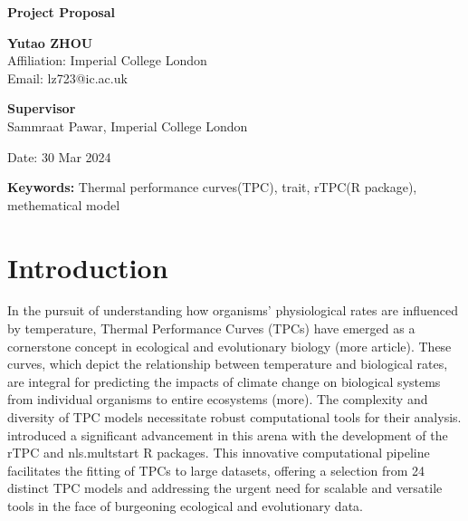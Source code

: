 \documentclass{article}
\begin{document}
\begin{titlepage}
    \begin{center}
        \vspace*{1cm}
        
        \Large
        \textbf{Project Proposal}
        
        \vspace{1.5cm}
        
        \textbf{Yutao ZHOU}\\
        Affiliation: Imperial College London\\
        Email: lz723@ic.ac.uk

        \vspace{0.8cm}

        \textbf{Supervisor}\\
        Sammraat Pawar, Imperial College London
       
        \vfill
        \Large
        Date:  30 Mar 2024
        
    \end{center}
\end{titlepage}

\linenumbers
\modulolinenumbers[5]
\noindent \textbf{Keywords: } Thermal performance curves(TPC), trait, rTPC(R package), methematical model 

\section{Introduction}
In the pursuit of understanding how organisms' physiological rates are influenced by temperature, Thermal Performance Curves (TPCs) have emerged as a cornerstone concept in ecological and evolutionary biology \cite{Kontopoulos2020}(more article). These curves, which depict the relationship between temperature and biological rates, are integral for predicting the impacts of climate change on biological systems from individual organisms to entire ecosystems \cite{Mordecai2019}(more). The complexity and diversity of TPC models necessitate robust computational tools for their analysis. \cite{Padfield2021} introduced a significant advancement in this arena with the development of the rTPC and nls.multstart R packages. This innovative computational pipeline facilitates the fitting of TPCs to large datasets, offering a selection from 24 distinct TPC models and addressing the urgent need for scalable and versatile tools in the face of burgeoning ecological and evolutionary data.
\end{document}
